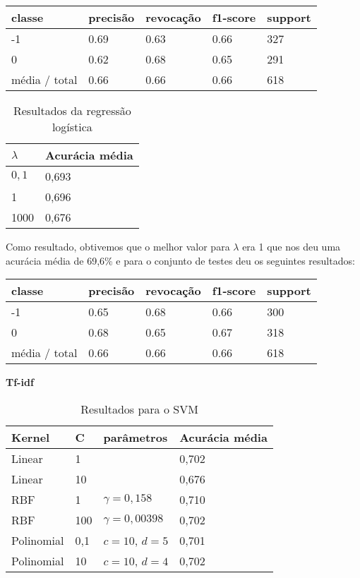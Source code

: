 \begin{table}[H]
	\centering
		\begin{tabular}{l | l | l | l | l}
		\hline
		classe  	&	precisão  &  revocação &  f1-score &  support \\
		\hline
		 -1    &   0.69   &   0.63   &   0.66   &    327 \\
		 \hline
          0    &   0.62   &   0.68   &   0.65   &    291 \\
		\hline
		média / total   &    0.66   &   0.66   &   0.66   &    618 \\
		\hline
	\end{tabular}
\end{table}

\begin{table}[H]
	\centering
	\caption{Resultados da regressão logística}
	\begin{tabular}{l l}
		\hline
		$\lambda$ & Acurácia média \\
		\hline
		$0,1$ & 0,693 \\
		\hline
		1 & 0,696 \\
		\hline
		1000 & 0,676 \\
	\end{tabular}
\end{table}

Como resultado, obtivemos que o melhor valor para $\lambda$ era 1 que nos deu uma acurácia
média de 69,6\% e para o conjunto de testes deu os seguintes resultados:

\begin{table}[H]
	\centering
		\begin{tabular}{l | l | l | l | l}
		\hline
		classe  	&	precisão  &  revocação &  f1-score &  support \\
		\hline
		 -1    &   0.65   &   0.68   &   0.66   &    300 \\
		 \hline
          0    &   0.68   &   0.65   &   0.67   &    318 \\
		\hline
		média / total   &    0.66   &   0.66   &   0.66   &    618 \\
		\hline
	\end{tabular}
\end{table}


\textbf{Tf-idf}

\begin{table}[H]
	\centering
	\caption{Resultados para o SVM}
	\begin{tabular}{l l l l}
		\hline
		Kernel & C & parâmetros & Acurácia média \\
		\hline
		Linear & 1 & & 0,702 \\
		\hline
		Linear & 10 & & 0,676 \\
		\hline
		RBF & 1 & $\gamma = 0,158$ & 0,710 \\
		\hline
		RBF & 100 & $\gamma = 0,00398$ & 0,702 \\
		\hline
		Polinomial & 0,1 & $c = 10$, $d = 5$ & 0,701 \\
		\hline
		Polinomial & 10 & $c = 10$, $d = 4$ & 0,702 \\
		\hline
	\end{tabular}
\end{table}

